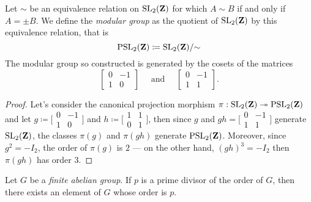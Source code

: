 \begin{proposition}
    \label{prop:PSL_2(Z)-generators}
    Let \(\sim\) be an equivalence relation on \(\operatorname{SL}_2(\mathbf{Z})\) for which \(A \sim B\)
    if and only if \(A = \pm B\). We define the \emph{modular group} as the quotient
    of \(\operatorname{SL}_2(\mathbf{Z})\) by this equivalence relation, that is
    \[
        \operatorname{PSL}_2(\mathbf{Z}) \coloneq \operatorname{SL}_2(\mathbf{Z})/{\sim}
    \]
    The modular group so constructed is generated by the cosets of the matrices
    \[
        \begin{bmatrix}
            0 & -1 \\ 1 & 0
        \end{bmatrix}
        \quad
        \text{ and }
        \quad
        \begin{bmatrix}
            0 & -1 \\ 1 & 1
        \end{bmatrix}.
    \]
\end{proposition}

\begin{proof}
    Let's consider the canonical projection morphism
    \(\pi: \operatorname{SL}_2(\mathbf{Z}) \twoheadrightarrow \operatorname{PSL}_2(\mathbf{Z})\) and let \(g \coloneq \big[
        \begin{smallmatrix}
            0 & -1 \\ 1 & 0
        \end{smallmatrix} \big]
    \) and \(h \coloneq \big[
        \begin{smallmatrix}
            1 & 1 \\ 0 & 1
        \end{smallmatrix} \big]\), then since \(g\) and \(g h = \big[
        \begin{smallmatrix}
            0 & -1 \\ 1 & 1
        \end{smallmatrix} \big]\) generate \(\operatorname{SL}_2(\mathbf{Z})\), the classes \(\pi(g)\) and
    \(\pi(gh)\) generate \(\operatorname{PSL}_2(\mathbf{Z})\). Moreover, since \(g^2 = -I_2\), the order
    of \(\pi(g)\) is \(2\) --- on the other hand, \((g h)^3 = -I_2\) then
    \(\pi(gh)\) has order \(3\).
\end{proof}

\begin{proposition}
    \label{prop:finite-abelian-p-div-then-elem-of-p-order}
    Let \(G\) be a \emph{finite abelian group}. If \(p\) is a prime divisor of the
    order of \(G\), then there exists an element of \(G\) whose order is \(p\).
\end{proposition}

